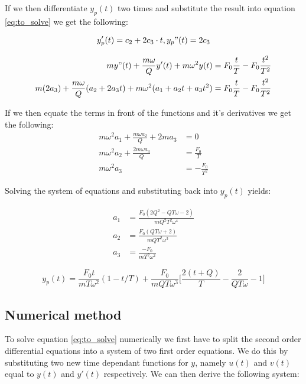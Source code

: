 If we then differentiate $y_p(t)$ two times and substitute the result into equation \ref{eq:to_solve} we get the following:

\begin{equation*}
    y_p'(t) = c_2 + 2c_3 \cdot t,    y_p"(t) = 2c_3
\end{equation*}

\begin{align*}
    m y"(t)+ \frac{m \omega}{Q} y'(t) + m \omega^2 y(t) &= F_0 \frac{t}{T} -F_0 \frac{t^2}{T^2}\\
    m (2a_3) + \frac{m \omega}{Q} (a_2 +2a_3 t) + m \omega^2 (a_1 + a_2 t + a_3t^2) &= F_0 \frac{t}{T} -F_0 \frac{t^2}{T^2}
\end{align*}

If we then equate the terms in front of the functions and it's derivatives we get the following:\\
\begin{align*}
    m\omega^2 a_1 + \frac{m \omega a_2}{Q} + 2ma_3 &= 0\\
    m \omega^2 a_2 + \frac{2m\omega a_3}{Q} &= \frac{F_0}{T}\\
    m \omega^2 a_3 &= -\frac{F_0}{T^2}
\end{align*}

Solving the system of equations and substituting back into $y_p(t)$ yields:

\begin{align*}
    a_1 &= \frac{F_0 ( 2Q^2 -Q T\omega -2)}{mQ^2 T^2 \omega^4}\\
    a_2 &= \frac{F_0 ( QT\omega +2)}{mQT^2\omega^3}\\
    a_3 &= \frac{-F_0}{mT^2 \omega^2}
\end{align*}

\begin{equation}
    y_p(t)=\frac{F_0 t}{mT\omega^2}(1-t/T)+\frac{F_0}{mQT\omega^3}\biggl[\frac{2(t+Q)}{T}-\frac{2}{QT\omega}-1\biggr]
\end{equation}
\clearpage
\subsection{Numerical method}
To solve equation \ref{eq:to_solve} numerically we first have to split the second order differential equations into a system of two first order equations. We do this by substituting two new time dependant functions for $y$, namely $u(t)$ and $v(t)$ equal to $y(t)$ and $y'(t)$ respectively. We can then derive the following system:\\

